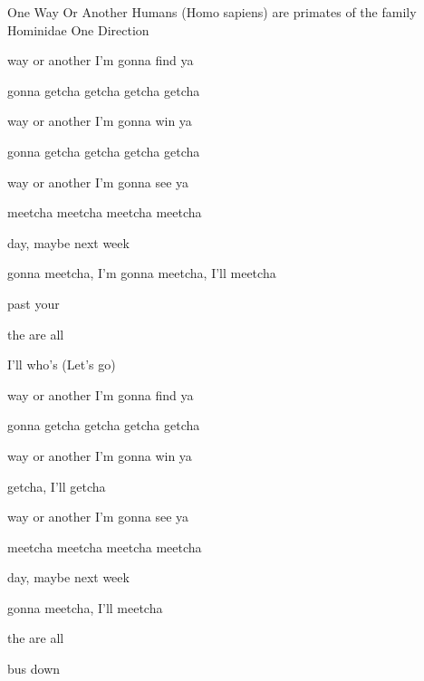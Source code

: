 \begin{SBSong}{One Way Or Another}
    {Humans (Homo sapiens) are primates of the family Hominidae}
    {One Direction}
  \begin{SBChorus}
     way or another I'm gonna find ya

     gonna getcha getcha getcha getcha

     way or another I'm gonna win ya

     gonna getcha getcha getcha getcha

     way or another I'm gonna see ya

     meetcha meetcha meetcha meetcha

     day, maybe next week

     gonna meetcha, I'm gonna meetcha, I'll meetcha
  \end{SBChorus}
  \begin{SBVerse}
      past your 

     the  are all 

   I'll  who's   (Let's go)
  \end{SBVerse}
  \begin{SBChorus}
     way or another I'm gonna find ya

     gonna getcha getcha getcha getcha

     way or another I'm gonna win ya

     getcha, I'll getcha

     way or another I'm gonna see ya

     meetcha meetcha meetcha meetcha

     day, maybe next week

     gonna meetcha, I'll meetcha
  \end{SBChorus}
  \CBPageBrk
  \begin{SBVerse}
      the  are all 

       bus down


\end{SBVerse}
\end{SBSong}
